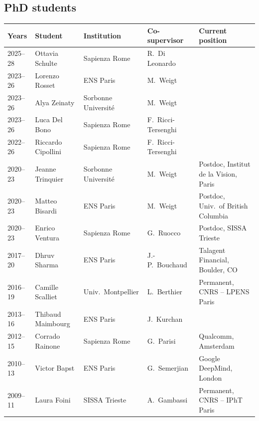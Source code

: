 \documentclass[a4paper,10pt]{article}
\begin{document}
\subsection{PhD students}
\vspace{4pt}
{\small
\begin{tabularx}{\textwidth}{@{}>{\hspace{0pt}\color{datecol}}p{} p{} p{} p{} >{\raggedright\arraybackslash}X@{}}
\textbf{Years} & \textbf{Student} & \textbf{Institution} & \textbf{Co-supervisor} & \textbf{Current position} \\[1pt]
\hline
2025--28 & Ottavia Schulte & Sapienza Rome & R.~Di Leonardo & \\
2023--26 & Lorenzo Rosset & ENS Paris & M.~Weigt & \\
2023--26 & Alya Zeinaty & Sorbonne Université & M.~Weigt & \\
2023--26 & Luca Del Bono & Sapienza Rome & F.~Ricci-Tersenghi & \\
2022--26 & Riccardo Cipollini & Sapienza Rome & F.~Ricci-Tersenghi & \\
2020--23 & Jeanne Trinquier & Sorbonne Université & M.~Weigt & Postdoc, Institut de la Vision, Paris \\
2020--23 & Matteo Bisardi & ENS Paris & M.~Weigt & Postdoc, Univ.~of British Columbia \\
2020--23 & Enrico Ventura & Sapienza Rome & G.~Ruocco & Postdoc, SISSA Trieste \\
2017--20 & Dhruv Sharma & ENS Paris & J.-P.~Bouchaud & Talagent Financial, Boulder, CO \\
2016--19 & Camille Scalliet & Univ.~Montpellier & L.~Berthier & Permanent, CNRS -- LPENS Paris \\
2013--16 & Thibaud Maimbourg & ENS Paris & J.~Kurchan & \\
2012--15 & Corrado Rainone & Sapienza Rome & G.~Parisi & Qualcomm, Amsterdam \\
2010--13 & Victor Bapst & ENS Paris & G.~Semerjian & Google DeepMind, London \\
2009--11 & Laura Foini & SISSA Trieste & A.~Gambassi & Permanent, CNRS -- IPhT Paris \\
\hline
\end{tabularx}}
\end{document}
